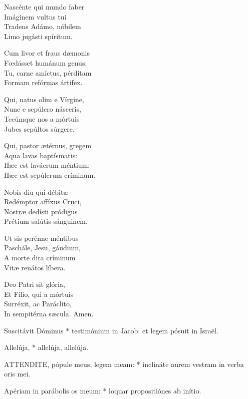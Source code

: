 Nascénte qui mundo faber\\
Imáginem vultus tui\\
Tradens Adámo, nóbilem\\
Limo jugásti spíritum.

Cum livor et fraus dæmonis\\
Fœdásset humánum genus:\\
Tu, carne amíctus, pérditam\\
Formam refórmas ártifex.

Qui, natus olim e Vírgine,\\
Nunc e sepúlcro násceris,\\
Tecúmque nos a mórtuis\\
Jubes sepúltos súrgere.

Qui, pastor ætérnus, gregem\\
Aqua lavas baptísmatis:\\
Hæc est lavácrum méntium:\\
Hæc est sepúlcrum críminum.

Nobis diu qui débitæ\\
Redémptor affíxus Cruci,\\
Nostræ dedísti pródigus\\
Prétium salútis sánguinem.

Ut sis perénne méntibus\\
Paschále, Jesu, gáudium,\\
A morte dira críminum\\
Vitæ renátos líbera.

Deo Patri sit glória,\\
Et Fílio, qui a mórtuis\\
Surréxit, ac Paráclito,\\
In sempitérna sæcula. Amen.



 Suscitávit Dóminus * testimónium in Jacob: et legem pósuit in Israël.


 Allelúja, * allelúja, allelúja.


\lettrine[lines=2]{A}{TTENDITE}, pópule meus, legem meam: * inclináte aurem vestram in verba oris mei.

Apériam in parábolis os meum: * loquar propositiónes ab inítio.

